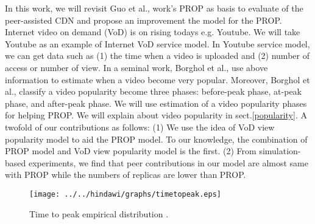 In this work, we will revisit Guo et al., \cite{1613869} work's PROP as basis to evaluate of the peer-assisted CDN and propose an improvement the model for the PROP.
Internet video on demand (VoD) is on rising todays e.g. Youtube.
We will take Youtube as an example of Internet VoD service model.
In Youtube service model, we can get data such as (1) the time when a video is uploaded and (2) number of access or number of view.
In a seminal work, Borghol et al., \cite{Borghol:2011:CMP:2039452.2039717} use above information to estimate when a video become very popular.
Moreover, Borghol et al., \cite{Borghol:2011:CMP:2039452.2039717} classify a video popularity become three phases: before-peak phase, at-peak phase, and after-peak phase.
We will use estimation of a video popularity phases for helping PROP.
We will explain about video popularity in sect.\ref{popularity}.
A twofold of our contributions as follows:
(1) We use the idea of VoD view popularity model to aid the PROP model. 
To our knowledge, the combination of PROP model and VoD view popularity model is the first.
(2) From simulation-based experiments, we find that peer contributions in our model are almost same with PROP while the numbers of replicas are lower than PROP.



\begin{figure}[!t]
\begin{center}
\texttt{[image: ../../hindawi/graphs/timetopeak.eps]}
\end{center}
\caption{Time to peak empirical distribution \cite{Borghol:2011:CMP:2039452.2039717}.}
\label{fig:timetopeak}
\end{figure} 




